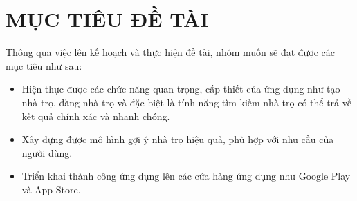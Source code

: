 \section{MỤC TIÊU ĐỀ TÀI}
Thông qua việc lên kế hoạch và thực hiện đề tài, nhóm muốn sẽ đạt được các mục tiêu như sau:
\begin{itemize}
    \item Hiện thực được các chức năng quan trọng, cấp thiết của ứng dụng như tạo nhà trọ, đăng nhà trọ và đặc biệt là tính năng tìm kiếm nhà trọ có thể trả về kết quả chính xác và nhanh chóng.
    \item Xây dựng được mô hình gợi ý nhà trọ hiệu quả, phù hợp với nhu cầu của người dùng.
    \item Triển khai thành công ứng dụng lên các cửa hàng ứng dụng như Google Play và App Store.
\end{itemize}